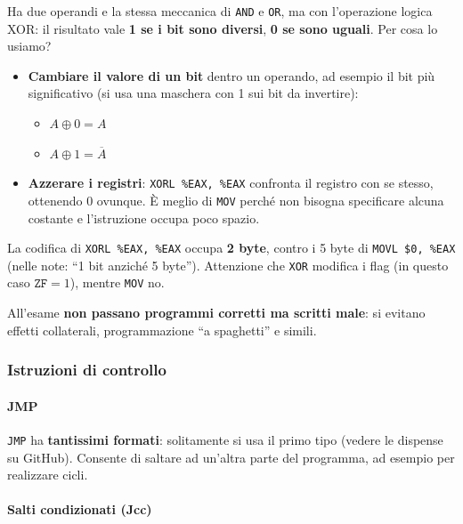 \documentclass[11pt,a4paper]{article}
\begin{document}
Ha due operandi e la stessa meccanica di \texttt{AND} e \texttt{OR}, ma con l'operazione logica XOR: il risultato vale \textbf{1 se i bit sono diversi}, \textbf{0 se sono uguali}. Per cosa lo usiamo?

\begin{itemize}[leftmargin=*]
  \item \textbf{Cambiare il valore di un bit} dentro un operando, ad esempio il bit più significativo (si usa una maschera con 1 sui bit da invertire):
  \begin{itemize}
    \item $A \oplus 0 = A$
    \item $A \oplus 1 = \overline{A}$
  \end{itemize}
  \item \textbf{Azzerare i registri}: \texttt{XORL \%EAX, \%EAX} confronta il registro con se stesso, ottenendo 0 ovunque. È meglio di \texttt{MOV} perché non bisogna specificare alcuna costante e l'istruzione occupa poco spazio.
\end{itemize}

\begin{integrazione}
La codifica di \texttt{XORL \%EAX, \%EAX} occupa \textbf{2 byte}, contro i 5 byte di \texttt{MOVL \$0, \%EAX} (nelle note: ``1 bit anziché 5 byte''). Attenzione che \texttt{XOR} modifica i flag (in questo caso $\texttt{ZF}=1$), mentre \texttt{MOV} no.
\end{integrazione}

\begin{nota}
All'esame \textbf{non passano programmi corretti ma scritti male}: si evitano effetti collaterali, programmazione ``a spaghetti'' e simili.
\end{nota}

\subsubsection*{Istruzioni di controllo}

\paragraph*{JMP}

\texttt{JMP} ha \textbf{tantissimi formati}: solitamente si usa il primo tipo (vedere le dispense su GitHub). Consente di saltare ad un'altra parte del programma, ad esempio per realizzare cicli.

\paragraph*{Salti condizionati (Jcc)}
\end{document}
